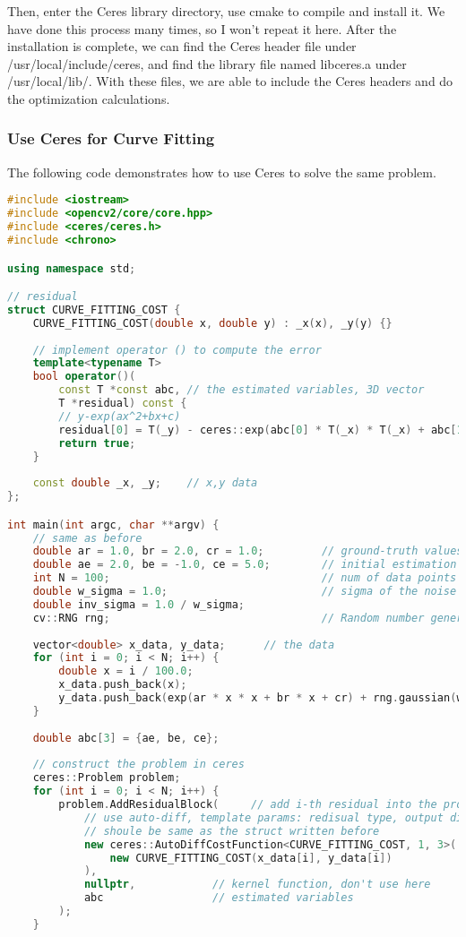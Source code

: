 Then, enter the Ceres library directory, use cmake to compile and install it. We have done this process many times, so I won't repeat it here. After the installation is complete, we can find the Ceres header file under /usr/local/include/ceres, and find the library file named libceres.a under /usr/local/lib/. With these files, we are able to include the Ceres headers and do the optimization calculations.

\subsubsection{Use Ceres for Curve Fitting}
The following code demonstrates how to use Ceres to solve the same problem.
\begin{lstlisting}[language=c++,caption=slambook/ch6/ceresCurveFitting.cpp]
#include <iostream>
#include <opencv2/core/core.hpp>
#include <ceres/ceres.h>
#include <chrono>

using namespace std;

// residual
struct CURVE_FITTING_COST {
    CURVE_FITTING_COST(double x, double y) : _x(x), _y(y) {}
    
    // implement operator () to compute the error
    template<typename T>
    bool operator()(
        const T *const abc, // the estimated variables, 3D vector
        T *residual) const {
        // y-exp(ax^2+bx+c)
        residual[0] = T(_y) - ceres::exp(abc[0] * T(_x) * T(_x) + abc[1] * T(_x) + abc[2]);
        return true;
    }
    
    const double _x, _y;    // x,y data 
};

int main(int argc, char **argv) {
    // same as before
    double ar = 1.0, br = 2.0, cr = 1.0;         // ground-truth values
    double ae = 2.0, be = -1.0, ce = 5.0;        // initial estimation
    int N = 100;                                 // num of data points
    double w_sigma = 1.0;                        // sigma of the noise
    double inv_sigma = 1.0 / w_sigma;
    cv::RNG rng;                                 // Random number generator 
    
    vector<double> x_data, y_data;      // the data
    for (int i = 0; i < N; i++) {
        double x = i / 100.0;
        x_data.push_back(x);
        y_data.push_back(exp(ar * x * x + br * x + cr) + rng.gaussian(w_sigma * w_sigma));
    }
    
    double abc[3] = {ae, be, ce};
    
    // construct the problem in ceres
    ceres::Problem problem;
    for (int i = 0; i < N; i++) {
        problem.AddResidualBlock(     // add i-th residual into the problem
            // use auto-diff, template params: redisual type, output dimension, input dimension
            // shoule be same as the struct written before
            new ceres::AutoDiffCostFunction<CURVE_FITTING_COST, 1, 3>(
                new CURVE_FITTING_COST(x_data[i], y_data[i])
            ),
            nullptr,            // kernel function, don't use here
            abc                 // estimated variables
        );
    }
    

\end{lstlisting}
